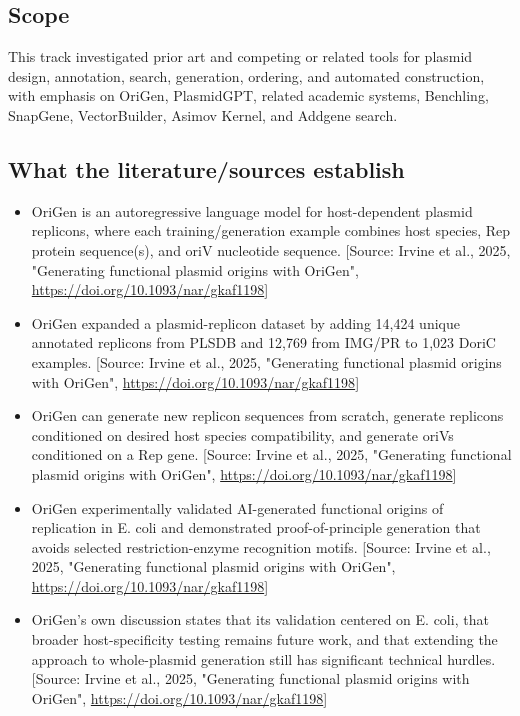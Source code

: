 \documentclass[11pt]{report}
\begin{document}
\subsection{Scope}
This track investigated prior art and competing or related tools for plasmid design, annotation, search, generation, ordering, and automated construction, with emphasis on OriGen, PlasmidGPT, related academic systems, Benchling, SnapGene, VectorBuilder, Asimov Kernel, and Addgene search.\par

\subsection{What the literature/sources establish}
\begin{itemize}
\item OriGen is an autoregressive language model for host-dependent plasmid replicons, where each training/generation example combines host species, Rep protein sequence(s), and oriV nucleotide sequence. [Source: Irvine et al., 2025, "Generating functional plasmid origins with OriGen", \url{https://doi.org/10.1093/nar/gkaf1198}]
\item OriGen expanded a plasmid-replicon dataset by adding 14,424 unique annotated replicons from PLSDB and 12,769 from IMG/PR to 1,023 DoriC examples. [Source: Irvine et al., 2025, "Generating functional plasmid origins with OriGen", \url{https://doi.org/10.1093/nar/gkaf1198}]
\item OriGen can generate new replicon sequences from scratch, generate replicons conditioned on desired host species compatibility, and generate oriVs conditioned on a Rep gene. [Source: Irvine et al., 2025, "Generating functional plasmid origins with OriGen", \url{https://doi.org/10.1093/nar/gkaf1198}]
\item OriGen experimentally validated AI-generated functional origins of replication in E. coli and demonstrated proof-of-principle generation that avoids selected restriction-enzyme recognition motifs. [Source: Irvine et al., 2025, "Generating functional plasmid origins with OriGen", \url{https://doi.org/10.1093/nar/gkaf1198}]
\item OriGen's own discussion states that its validation centered on E. coli, that broader host-specificity testing remains future work, and that extending the approach to whole-plasmid generation still has significant technical hurdles. [Source: Irvine et al., 2025, "Generating functional plasmid origins with OriGen", \url{https://doi.org/10.1093/nar/gkaf1198}]

\end{itemize}
\end{document}
